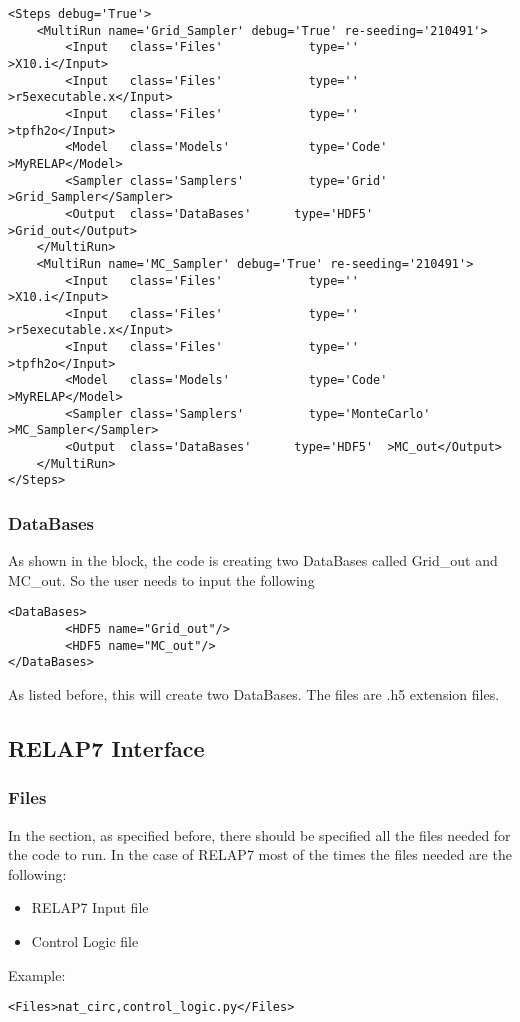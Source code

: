 \begin{lstlisting}[style=XML]
    <Steps debug='True'>
    <MultiRun name='Grid_Sampler' debug='True' re-seeding='210491'>
        <Input   class='Files'            type=''                >X10.i</Input>
        <Input   class='Files'            type=''                >r5executable.x</Input>
        <Input   class='Files'            type=''                >tpfh2o</Input>
        <Model   class='Models'           type='Code'            >MyRELAP</Model>
        <Sampler class='Samplers'         type='Grid'             >Grid_Sampler</Sampler>
        <Output  class='DataBases'      type='HDF5'  >Grid_out</Output>
    </MultiRun>
	<MultiRun name='MC_Sampler' debug='True' re-seeding='210491'>
        <Input   class='Files'            type=''                >X10.i</Input>
        <Input   class='Files'            type=''                >r5executable.x</Input>
        <Input   class='Files'            type=''                >tpfh2o</Input>
        <Model   class='Models'           type='Code'            >MyRELAP</Model>
        <Sampler class='Samplers'         type='MonteCarlo'             >MC_Sampler</Sampler>
        <Output  class='DataBases'      type='HDF5'  >MC_out</Output>
    </MultiRun>
</Steps>
\end{lstlisting}
\subsubsection{DataBases}
As shown in the  block, the code is creating two DataBases called
Grid\_out and MC\_out.
%
So the user needs to input the following
\begin{lstlisting}[style=XML]
<DataBases>
        <HDF5 name="Grid_out"/>
        <HDF5 name="MC_out"/>
</DataBases>
\end{lstlisting}
As listed before, this will create two DataBases.
%
The files are .h5 extension files.

\subsection{RELAP7 Interface}
\subsubsection{Files}
In the  section, as specified before, there should be specified all the
files needed for the code to run.
%
In the case of RELAP7 most of the times the files needed are the following:
\begin{itemize}
  \item RELAP7 Input file
  \item Control Logic file
\end{itemize}
Example:
\begin{lstlisting}[style=XML]
<Files>nat_circ,control_logic.py</Files>
\end{lstlisting}
